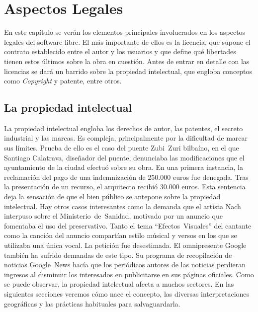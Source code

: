 %
%

\chapter{Aspectos Legales}
\label{CHAP2:LegalAspects}
En este capítulo se verán los elementos principales involucrados en
los aspectos legales del software libre. El más importante de ellos es
la licencia, que supone el contrato establecido entre el autor y los
usuarios y que define qué libertades tienen estos últimos sobre la
obra en cuestión. Antes de entrar en detalle con las licencias se dará
un barrido sobre la propiedad intelectual, que engloba conceptos como
\emph{Copyright} y patente, entre otros.

\section{La propiedad intelectual}
La propiedad intelectual engloba los derechos de autor, las patentes,
el secreto industrial y las marcas. Es compleja, principalmente por la
dificultad de marcar sus límites. Prueba de ello es el caso del puente
Zubi~Zuri bilbaíno, en el que Santiago Calatrava, diseñador del
puente, denunciaba las modificaciones que el ayuntamiento de la ciudad
efectuó sobre su obra. En una primera instancia, la reclamación del
pago de una indemnización de 250.000 euros fue denegada. Tras la
presentación de un recurso, el arquitecto recibió 30.000 euros. Esta
sentencia deja la sensación de que el bien público se antepone sobre
la propiedad intelectual. Hay otros casos interesantes como la demanda
que el artista Nach interpuso sobre el Ministerio~de~Sanidad, motivado
por un anuncio que fomentaba el uso del preservativo. Tanto el tema
``Efectos~Visuales'' del cantante como la canción del anuncio
compartían estilo músical y versos en los que se utilizaba una única
vocal. La petición fue desestimada. El omnipresente Google también ha
sufrido demandas de este tipo. Su programa de recopilación de noticias
Google~News hacía que los periódicos autores de las noticias perdieran
ingresos al disminuir los interesados en publicitarse en sus páginas
oficiales. Como se puede observar, la propiedad intelectual afecta a
muchos sectores. En las siguientes secciones veremos cómo nace el
concepto, las diversas interpretaciones geográficas y las prácticas
habituales para salvaguardarla.

